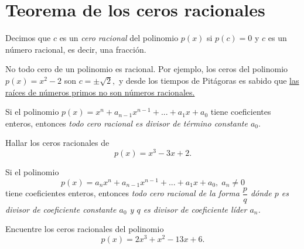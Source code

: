 
\section{Teorema de los ceros racionales}


	Decimos que $c$ es un \emph{cero racional} del polinomio $p(x)$ si $p(c)=0$ y $c$ es un número racional, es decir, una fracci\'on.



	\begin{rem}
		No todo cero de un polinomio es racional. Por ejemplo, los ceros del polinomio $p(x)=x^{2}-2$ son $c=\pm\sqrt{2},$ y desde los tiempos de Pitágoras es sabido que \href{https://www.youtube.com/watch?v=gVkB3XuK6MU}{las ra\'ices de números primos no son números racionales.}
	\end{rem}
	




	\begin{thm}
		Si el polinomio {\color{blue}$p(x)=x^{n}+a_{n-1}x^{n-1}+...+a_{1}x+a_{0}$} tiene {\color{green}coeficientes enteros}, entonces \emph{todo cero racional es divisor de t\'ermino constante $a_{0}.$}
	\end{thm}
	



	\begin{problema}
		Hallar los ceros racionales de 
		$$
		p(x)=x^{3}-3x+2.
		$$
	\end{problema}
	



	\begin{thm}
		Si el polinomio {\color{blue}$$p(x)=a_{n}x^{n}+a_{n-1}x^{n-1}+...+a_{1}x+a_{0}, \; a_{n}\neq 0$$} tiene {\color{green}coeficientes enteros}, entonces \emph{todo cero racional de la forma $\displaystyle\dfrac{p}{q}$ d\'onde $p$ es divisor de coeficiente constante $a_{0}$ y $q$ es divisor de coeficiente l\'ider $a_{n}$.} 
	\end{thm}



	\begin{problema}
		Encuentre los ceros racionales del polinomio $$p(x)=2x^{3}+x^{2}-13x+6.$$
	\end{problema}
	


